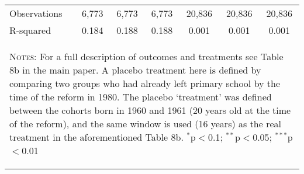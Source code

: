 \begin{landscape}
\begin{table}[htpb!]
\begin{center}
\begin{tabular}{lcccccc}
Observations&6,773&6,773&6,773&20,836&20,836&20,836\\
R-squared&0.184&0.188&0.188&0.001&0.001&0.001\\
\midrule
\multicolumn{7}{p{15.4cm}}{\begin{footnotesize}\textsc{Notes:} For a full description of outcomes and treatments see Table 8b in the main paper. A placebo treatment here is defined by comparing two groups who had already left primary school by the time of the reform in 1980.  The placebo `treatment' was defined between the cohorts born in 1960 and 1961 (20 years old at the time of the reform), and the same window is used (16 years) as the real treatment in the aforementioned Table 8b.
$^{*}$p$<$0.1; $^{**}$p$<$0.05; $^{***}$p$<$0.01\end{footnotesize}} \\ \bottomrule 
\end{tabular}\end{center}\end{table}\end{landscape}

